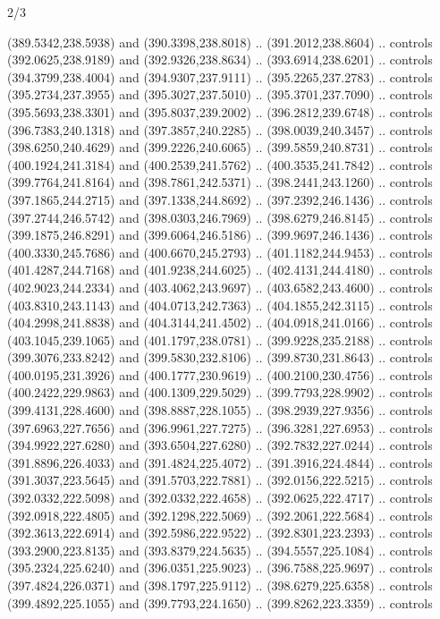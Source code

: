 \begin{flagdescription}{2/3}
\begin{scope}[xshift=0.5\flaglength,yshift=0.5\flagwidth,scale=\flagwidth/495.65]
\begin{scope}[y=0.8pt, x=0.8pt, yscale=-1,shift={(-463.76,-309.78)}]
  (389.5342,238.5938) and (390.3398,238.8018) .. (391.2012,238.8604) .. controls
  (392.0625,238.9189) and (392.9326,238.8634) .. (393.6914,238.6201) .. controls
  (394.3799,238.4004) and (394.9307,237.9111) .. (395.2265,237.2783) .. controls
  (395.2734,237.3955) and (395.3027,237.5010) .. (395.3701,237.7090) .. controls
  (395.5693,238.3301) and (395.8037,239.2002) .. (396.2812,239.6748) .. controls
  (396.7383,240.1318) and (397.3857,240.2285) .. (398.0039,240.3457) .. controls
  (398.6250,240.4629) and (399.2226,240.6065) .. (399.5859,240.8731) .. controls
  (400.1924,241.3184) and (400.2539,241.5762) .. (400.3535,241.7842) .. controls
  (399.7764,241.8164) and (398.7861,242.5371) .. (398.2441,243.1260) .. controls
  (397.1865,244.2715) and (397.1338,244.8692) .. (397.2392,246.1436) .. controls
  (397.2744,246.5742) and (398.0303,246.7969) .. (398.6279,246.8145) .. controls
  (399.1875,246.8291) and (399.6064,246.5186) .. (399.9697,246.1436) .. controls
  (400.3330,245.7686) and (400.6670,245.2793) .. (401.1182,244.9453) .. controls
  (401.4287,244.7168) and (401.9238,244.6025) .. (402.4131,244.4180) .. controls
  (402.9023,244.2334) and (403.4062,243.9697) .. (403.6582,243.4600) .. controls
  (403.8310,243.1143) and (404.0713,242.7363) .. (404.1855,242.3115) .. controls
  (404.2998,241.8838) and (404.3144,241.4502) .. (404.0918,241.0166) .. controls
  (403.1045,239.1065) and (401.1797,238.0781) .. (399.9228,235.2188) .. controls
  (399.3076,233.8242) and (399.5830,232.8106) .. (399.8730,231.8643) .. controls
  (400.0195,231.3926) and (400.1777,230.9619) .. (400.2100,230.4756) .. controls
  (400.2422,229.9863) and (400.1309,229.5029) .. (399.7793,228.9902) .. controls
  (399.4131,228.4600) and (398.8887,228.1055) .. (398.2939,227.9356) .. controls
  (397.6963,227.7656) and (396.9961,227.7275) .. (396.3281,227.6953) .. controls
  (394.9922,227.6280) and (393.6504,227.6280) .. (392.7832,227.0244) .. controls
  (391.8896,226.4033) and (391.4824,225.4072) .. (391.3916,224.4844) .. controls
  (391.3037,223.5645) and (391.5703,222.7881) .. (392.0156,222.5215) .. controls
  (392.0332,222.5098) and (392.0332,222.4658) .. (392.0625,222.4717) .. controls
  (392.0918,222.4805) and (392.1298,222.5069) .. (392.2061,222.5684) .. controls
  (392.3613,222.6914) and (392.5986,222.9522) .. (392.8301,223.2393) .. controls
  (393.2900,223.8135) and (393.8379,224.5635) .. (394.5557,225.1084) .. controls
  (395.2324,225.6240) and (396.0351,225.9023) .. (396.7588,225.9697) .. controls
  (397.4824,226.0371) and (398.1797,225.9112) .. (398.6279,225.6358) .. controls
  (399.4892,225.1055) and (399.7793,224.1650) .. (399.8262,223.3359) .. controls

\end{scope}
\end{scope}
\end{flagdescription}
